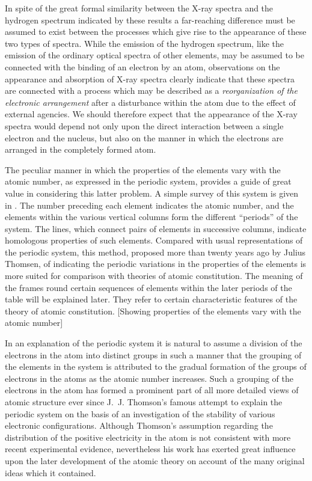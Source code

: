  In spite of the great formal similarity between
the X-ray spectra and the hydrogen spectrum indicated by these
results a far-reaching difference must be assumed to exist between
the processes which give rise to the appearance of these two types
of spectra. While the emission of the hydrogen spectrum, like the
emission of the ordinary optical spectra of other elements, may be
assumed to be connected with the binding of an electron by an
atom, observations on the appearance and absorption of X-ray
spectra clearly indicate that these spectra are connected with a
process which may be described as a \emph{reorganization of the electronic
arrangement} after a disturbance within the atom due to the effect
of external agencies. We should therefore expect that the appearance
of the X-ray spectra would depend not only upon the direct
interaction between a single electron and the nucleus, but also on
the manner in which the electrons are arranged in the completely
formed atom.

The peculiar manner in which the properties of the elements
vary with the atomic number, as expressed in the periodic system,
provides a guide of great value in considering this latter problem.
A simple survey of this system is given in . The number preceding
each element indicates the atomic number, and the elements
within the various vertical columns form the different ``periods'' of
the system. The lines, which connect pairs of elements in successive
columns, indicate homologous properties of such elements. Compared
with usual representations of the periodic system, this method,
proposed more than twenty years ago by Julius Thomsen, of indicating
the periodic variations in the properties of the elements is
more suited for comparison with theories of atomic constitution.
The meaning of the frames round certain sequences of elements
within the later periods of the table will be explained later. They
refer to certain characteristic features of the theory of atomic
constitution.
[Showing properties of the elements vary with the atomic number]


In an explanation of the periodic system it is natural to assume
a division of the electrons in the atom into distinct groups
in such a manner that the grouping of the elements in the system
is attributed to the gradual formation of the groups of electrons
in the atoms as the atomic number increases. Such a grouping
of the electrons in the atom has formed a prominent part of all
more detailed views of atomic structure ever since J.~J. Thomson's
famous attempt to explain the periodic system on the basis
of an investigation of the stability of various electronic configurations.
Although Thomson's assumption regarding the distribution
of the positive electricity in the atom is not consistent with more
recent experimental evidence, nevertheless his work has exerted
great influence upon the later development of the atomic theory on
account of the many original ideas which it contained.

